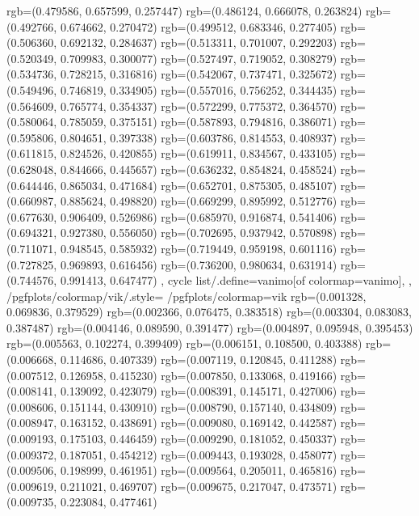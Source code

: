 {{{					rgb=(0.479586, 0.657599, 0.257447)
					rgb=(0.486124, 0.666078, 0.263824)
					rgb=(0.492766, 0.674662, 0.270472)
					rgb=(0.499512, 0.683346, 0.277405)
					rgb=(0.506360, 0.692132, 0.284637)
					rgb=(0.513311, 0.701007, 0.292203)
					rgb=(0.520349, 0.709983, 0.300077)
					rgb=(0.527497, 0.719052, 0.308279)
					rgb=(0.534736, 0.728215, 0.316816)
					rgb=(0.542067, 0.737471, 0.325672)
					rgb=(0.549496, 0.746819, 0.334905)
					rgb=(0.557016, 0.756252, 0.344435)
					rgb=(0.564609, 0.765774, 0.354337)
					rgb=(0.572299, 0.775372, 0.364570)
					rgb=(0.580064, 0.785059, 0.375151)
					rgb=(0.587893, 0.794816, 0.386071)
					rgb=(0.595806, 0.804651, 0.397338)
					rgb=(0.603786, 0.814553, 0.408937)
					rgb=(0.611815, 0.824526, 0.420855)
					rgb=(0.619911, 0.834567, 0.433105)
					rgb=(0.628048, 0.844666, 0.445657)
					rgb=(0.636232, 0.854824, 0.458524)
					rgb=(0.644446, 0.865034, 0.471684)
					rgb=(0.652701, 0.875305, 0.485107)
					rgb=(0.660987, 0.885624, 0.498820)
					rgb=(0.669299, 0.895992, 0.512776)
					rgb=(0.677630, 0.906409, 0.526986)
					rgb=(0.685970, 0.916874, 0.541406)
					rgb=(0.694321, 0.927380, 0.556050)
					rgb=(0.702695, 0.937942, 0.570898)
					rgb=(0.711071, 0.948545, 0.585932)
					rgb=(0.719449, 0.959198, 0.601116)
					rgb=(0.727825, 0.969893, 0.616456)
					rgb=(0.736200, 0.980634, 0.631914)
					rgb=(0.744576, 0.991413, 0.647477)
			},
		cycle list/.define={vanimo}{[of colormap=vanimo]},
		},
		/pgfplots/colormap/vik/.style={
			/pgfplots/colormap={vik}{%
					rgb=(0.001328, 0.069836, 0.379529)
					rgb=(0.002366, 0.076475, 0.383518)
					rgb=(0.003304, 0.083083, 0.387487)
					rgb=(0.004146, 0.089590, 0.391477)
					rgb=(0.004897, 0.095948, 0.395453)
					rgb=(0.005563, 0.102274, 0.399409)
					rgb=(0.006151, 0.108500, 0.403388)
					rgb=(0.006668, 0.114686, 0.407339)
					rgb=(0.007119, 0.120845, 0.411288)
					rgb=(0.007512, 0.126958, 0.415230)
					rgb=(0.007850, 0.133068, 0.419166)
					rgb=(0.008141, 0.139092, 0.423079)
					rgb=(0.008391, 0.145171, 0.427006)
					rgb=(0.008606, 0.151144, 0.430910)
					rgb=(0.008790, 0.157140, 0.434809)
					rgb=(0.008947, 0.163152, 0.438691)
					rgb=(0.009080, 0.169142, 0.442587)
					rgb=(0.009193, 0.175103, 0.446459)
					rgb=(0.009290, 0.181052, 0.450337)
					rgb=(0.009372, 0.187051, 0.454212)
					rgb=(0.009443, 0.193028, 0.458077)
					rgb=(0.009506, 0.198999, 0.461951)
					rgb=(0.009564, 0.205011, 0.465816)
					rgb=(0.009619, 0.211021, 0.469707)
					rgb=(0.009675, 0.217047, 0.473571)
					rgb=(0.009735, 0.223084, 0.477461)
}}}
